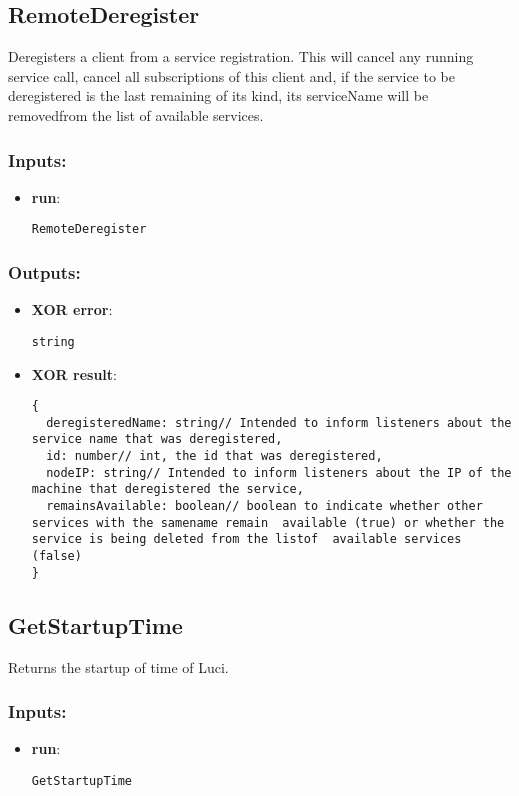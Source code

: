 \subsection{RemoteDeregister}
\label{ch:builtinservices:RemoteDeregister}
Deregisters
 a client from a service registration. This will cancel any running 
service call, cancel all subscriptions of this client and, if the 
service to be deregistered is the last remaining of its kind, its 
serviceName will be removedfrom the list of available services.
\subsubsection*{Inputs:}
\begin{itemize}
    \item \textbf{run}: 
\begin{lstlisting}
RemoteDeregister
\end{lstlisting}
  \end{itemize}

\subsubsection*{Outputs:}
\begin{itemize}
    \item \textbf{XOR error}: 
\begin{lstlisting}
string
\end{lstlisting}
    \item \textbf{XOR result}: 
\begin{lstlisting}
{
  deregisteredName: string// Intended to inform listeners about the service name that was deregistered, 
  id: number// int, the id that was deregistered, 
  nodeIP: string// Intended to inform listeners about the IP of the machine that deregistered the service, 
  remainsAvailable: boolean// boolean to indicate whether other services with the samename remain  available (true) or whether the service is being deleted from the listof  available services (false)
}
\end{lstlisting}
  \end{itemize}

\subsection{GetStartupTime}
\label{ch:builtinservices:GetStartupTime}
Returns the startup of time of Luci.
\subsubsection*{Inputs:}
\begin{itemize}
    \item \textbf{run}: 
\begin{lstlisting}
GetStartupTime
\end{lstlisting}
  \end{itemize}

